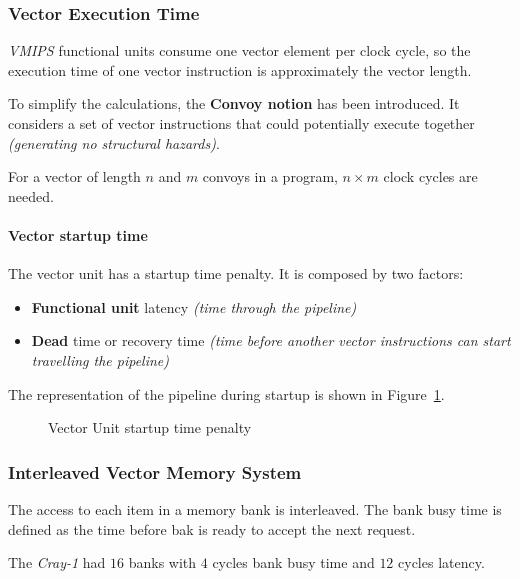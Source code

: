 \documentclass[english]{article}
\begin{document}
\subsubsection{Vector Execution Time}

\textit{VMIPS} functional units consume one vector element per clock cycle, so the execution time of one vector instruction is approximately the vector length.

To simplify the calculations, the \textbf{Convoy notion} has been introduced.
It considers a set of vector instructions that could potentially execute together \textit{(generating no structural hazards)}.

For a vector of length \(n\) and \(m\) convoys in a program, \(n \times m\) clock cycles are needed.

\paragraph{Vector startup time}

The vector unit has a startup time penalty.
It is composed by two factors:

\begin{itemize}
  \item \textbf{Functional unit} latency \textit{(time through the pipeline)}
  \item \textbf{Dead} time or recovery time \textit{(time before another vector instructions can start travelling the pipeline)}
\end{itemize}

The representation of the pipeline during startup is shown in Figure~\ref{fig:vector-unit-startup}.

\begin{figure}[htbp]
  \bigskip
  \centering
  \caption{Vector Unit startup time penalty}
  \label{fig:vector-unit-startup}
  \bigskip
\end{figure}

\subsubsection{Interleaved Vector Memory System}

The access to each item in a memory bank is interleaved.
The bank busy time is defined as the time before bak is ready to accept the next request.

The \textit{Cray-1} had \(16\) banks with \(4\) cycles bank busy time and \(12\) cycles latency.
\end{document}
